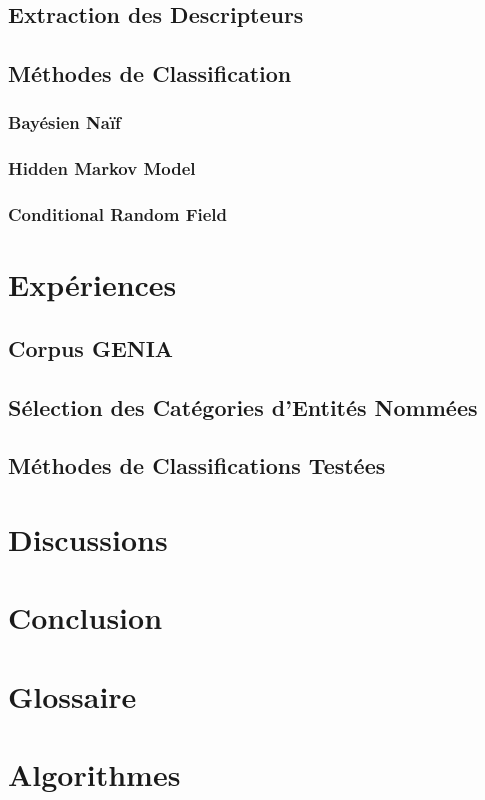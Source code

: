 \documentclass[11pt,a4paper]{report}
\begin{document}
	\section{Extraction des Descripteurs}
	\section{Méthodes de Classification}
		\subsection{Bayésien Naïf}
  		\subsection{Hidden Markov Model}
  		\subsection{Conditional Random Field}
  
  
\chapter{Expériences}
  	\section{Corpus GENIA}
  		
  	\section{Sélection des Catégories d'Entités Nommées}
  	\section{Méthodes de Classifications Testées}

\chapter{Discussions}


\chapter*{Conclusion}
	
	
\begin{appendices}
	\chapter{Glossaire}
		
	\chapter{Algorithmes}

	
	
\end{appendices}
\newpage
\newpage
\newpage
\end{document}
